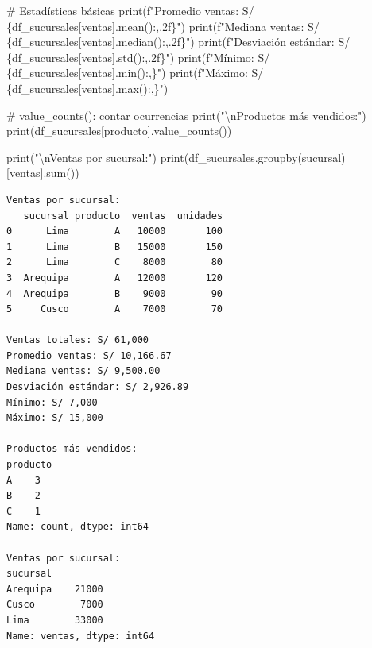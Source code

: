 \documentclass[
  doc,
  floatsintext,
  longtable,
  a4paper,
  nolmodern,
  notxfonts,
  notimes,
  12pt,
  colorlinks=true,linkcolor=blue,citecolor=blue,urlcolor=blue]{apa7}
\newenvironment{Shaded}{\begin{snugshade}}{\end{snugshade}}
\newcommand{\BuiltInTok}[1]{\textcolor[rgb]{0.00,0.23,0.31}{#1}}
\newcommand{\CharTok}[1]{\textcolor[rgb]{0.13,0.47,0.30}{#1}}
\newcommand{\CommentTok}[1]{\textcolor[rgb]{0.37,0.37,0.37}{#1}}
\newcommand{\NormalTok}[1]{\textcolor[rgb]{0.00,0.23,0.31}{#1}}
\newcommand{\SpecialCharTok}[1]{\textcolor[rgb]{0.37,0.37,0.37}{#1}}
\newcommand{\SpecialStringTok}[1]{\textcolor[rgb]{0.13,0.47,0.30}{#1}}
\newcommand{\StringTok}[1]{\textcolor[rgb]{0.13,0.47,0.30}{#1}}
\begin{document}
\begin{Shaded}
\begin{Highlighting}[]
\CommentTok{\# Estadísticas básicas}
\BuiltInTok{print}\NormalTok{(}\SpecialStringTok{f"Promedio ventas: S/ }\SpecialCharTok{\{}\NormalTok{df\_sucursales[}\StringTok{\textquotesingle{}ventas\textquotesingle{}}\NormalTok{]}\SpecialCharTok{.}\NormalTok{mean()}\SpecialCharTok{:,.2f\}}\SpecialStringTok{"}\NormalTok{)}
\BuiltInTok{print}\NormalTok{(}\SpecialStringTok{f"Mediana ventas: S/ }\SpecialCharTok{\{}\NormalTok{df\_sucursales[}\StringTok{\textquotesingle{}ventas\textquotesingle{}}\NormalTok{]}\SpecialCharTok{.}\NormalTok{median()}\SpecialCharTok{:,.2f\}}\SpecialStringTok{"}\NormalTok{)}
\BuiltInTok{print}\NormalTok{(}\SpecialStringTok{f"Desviación estándar: S/ }\SpecialCharTok{\{}\NormalTok{df\_sucursales[}\StringTok{\textquotesingle{}ventas\textquotesingle{}}\NormalTok{]}\SpecialCharTok{.}\NormalTok{std()}\SpecialCharTok{:,.2f\}}\SpecialStringTok{"}\NormalTok{)}
\BuiltInTok{print}\NormalTok{(}\SpecialStringTok{f"Mínimo: S/ }\SpecialCharTok{\{}\NormalTok{df\_sucursales[}\StringTok{\textquotesingle{}ventas\textquotesingle{}}\NormalTok{]}\SpecialCharTok{.}\BuiltInTok{min}\NormalTok{()}\SpecialCharTok{:,\}}\SpecialStringTok{"}\NormalTok{)}
\BuiltInTok{print}\NormalTok{(}\SpecialStringTok{f"Máximo: S/ }\SpecialCharTok{\{}\NormalTok{df\_sucursales[}\StringTok{\textquotesingle{}ventas\textquotesingle{}}\NormalTok{]}\SpecialCharTok{.}\BuiltInTok{max}\NormalTok{()}\SpecialCharTok{:,\}}\SpecialStringTok{"}\NormalTok{)}

\CommentTok{\# value\_counts(): contar ocurrencias}
\BuiltInTok{print}\NormalTok{(}\StringTok{"}\CharTok{\textbackslash{}n}\StringTok{Productos más vendidos:"}\NormalTok{)}
\BuiltInTok{print}\NormalTok{(df\_sucursales[}\StringTok{\textquotesingle{}producto\textquotesingle{}}\NormalTok{].value\_counts())}

\BuiltInTok{print}\NormalTok{(}\StringTok{"}\CharTok{\textbackslash{}n}\StringTok{Ventas por sucursal:"}\NormalTok{)}
\BuiltInTok{print}\NormalTok{(df\_sucursales.groupby(}\StringTok{\textquotesingle{}sucursal\textquotesingle{}}\NormalTok{)[}\StringTok{\textquotesingle{}ventas\textquotesingle{}}\NormalTok{].}\BuiltInTok{sum}\NormalTok{())}
\end{Highlighting}
\end{Shaded}

\begin{verbatim}
Ventas por sucursal:
   sucursal producto  ventas  unidades
0      Lima        A   10000       100
1      Lima        B   15000       150
2      Lima        C    8000        80
3  Arequipa        A   12000       120
4  Arequipa        B    9000        90
5     Cusco        A    7000        70

Ventas totales: S/ 61,000
Promedio ventas: S/ 10,166.67
Mediana ventas: S/ 9,500.00
Desviación estándar: S/ 2,926.89
Mínimo: S/ 7,000
Máximo: S/ 15,000

Productos más vendidos:
producto
A    3
B    2
C    1
Name: count, dtype: int64

Ventas por sucursal:
sucursal
Arequipa    21000
Cusco        7000
Lima        33000
Name: ventas, dtype: int64
\end{verbatim}
\end{document}
